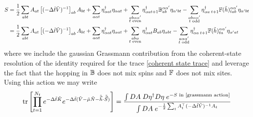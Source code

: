\begin{align}
	S &= 
	\frac{1}{2} \sum_{ab t} A_{at} \left[(-\Delta\tilde{t} \tilde{V})^{-1}\right]_{ab} A_{bt}
	+	\sum_{a \alpha t} \eta{}^{\dagger}_{\alpha a t} \eta_{\alpha a t}
+	\sum_{\substack{ab \alpha\alpha' \\ t\text{ even}}} \eta{}^{\dagger}_{\alpha a t+1} \mathbb{B}^{\alpha\alpha'}_{ab} \eta_{\alpha' b t}
-	\sum_{\substack{ab \alpha\alpha' \\ t\text{ odd}}}\eta{}^{\dagger}_{\alpha a\; t+1} \mathbb{F}(\tilde{h})^{\alpha\alpha'}_{tab} \eta_{\alpha' b t}
\nonumber\\
	&=
	\frac{1}{2} \sum_{ab t} A_{at} \left[(-\Delta\tilde{t} \tilde{V})^{-1}\right]_{ab} A_{bt}
+	\sum_{a \alpha t} \eta{}^{\dagger}_{\alpha a t} \eta_{\alpha a t}
+	\sum_{\substack{ab \alpha \\ t\text{ even}}} \eta{}^{\dagger}_{\alpha a t} B_{ab} \eta_{\alpha b t}
-	\sum_{\substack{a \alpha\alpha' \\ t\text{ odd}}}\eta{}^{\dagger}_{\alpha a\; t+1} \mathbb{F}(\tilde{h})^{\alpha\alpha'}_{ta} \eta_{\alpha' a t}
	\label{eq:grassmann action}
\end{align}
where we include the gaussian Grassmann contribution from the coherent-state resolution of the identity required for the trace \eqref{coherent state trace} and leverage the fact that the hopping in $\mathbb{B}$ does not mix spins and $\mathbb{F}$ does not mix sites.
Using this action we may write
\begin{align}
	\tr{\prod_{t=1}^{N_t} e^{-\Delta \tilde{t}\tilde{K}}  e^{-\Delta \tilde{t}(\tilde{V} - \tilde{\mu}\tilde{N} - \tilde{\vec{h}}\cdot\tilde{\vec{S}})} }
	= 
	\frac{  
		\int DA\; D\eta\adjoint D\eta\; e^{-S\text{ in \eqref{grassmann action}}}
	}{ 
		\int DA\; e^{-\frac{1}{2} \sum_t A\transpose_t (-\Delta\tilde{t} \tilde{V})\inverse A_t}
	}
\end{align}

